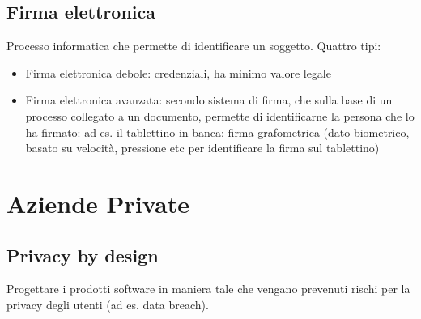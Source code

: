 \subsection{Firma elettronica}

Processo informatica che permette di identificare un soggetto. Quattro
tipi:

\begin{itemize}
\item
  Firma elettronica debole: credenziali, ha minimo valore legale
\item
  Firma elettronica avanzata: secondo sistema di firma, che sulla base
  di un processo collegato a un documento, permette di identificarne la
  persona che lo ha firmato: ad es. il tablettino in banca: firma
  grafometrica (dato biometrico, basato su velocit\`a, pressione etc per
  identificare la firma sul tablettino)
\end{itemize}

\section{Aziende Private}

\subsection{Privacy by design}

Progettare i prodotti software in maniera tale che vengano prevenuti
rischi per la privacy degli utenti (ad es. data breach).
